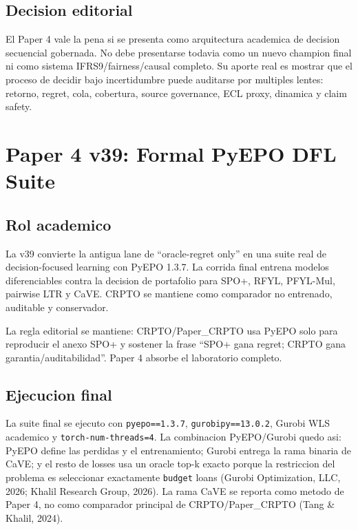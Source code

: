 \documentclass[
  spanish,
  11pt,
  letterpaper,
]{scrbook}
\theoremstyle{plain}
\theoremstyle{remark}
\begin{document}
\section{Decision editorial}\label{decision-editorial}

El Paper 4 vale la pena si se presenta como arquitectura academica de
decision secuencial gobernada. No debe presentarse todavia como un nuevo
champion final ni como sistema IFRS9/fairness/causal completo. Su aporte
real es mostrar que el proceso de decidir bajo incertidumbre puede
auditarse por multiples lentes: retorno, regret, cola, cobertura, source
governance, ECL proxy, dinamica y claim safety.

\chapter{Paper 4 v39: Formal PyEPO DFL
Suite}\label{paper-4-v39-formal-pyepo-dfl-suite}

\section{Rol academico}\label{rol-academico}

La v39 convierte la antigua lane de ``oracle-regret only'' en una suite
real de decision-focused learning con PyEPO 1.3.7. La corrida final
entrena modelos diferenciables contra la decision de portafolio para
SPO+, RFYL, PFYL-Mul, pairwise LTR y CaVE. CRPTO se mantiene como
comparador no entrenado, auditable y conservador.

La regla editorial se mantiene: CRPTO/Paper\_CRPTO usa PyEPO solo para
reproducir el anexo SPO+ y sostener la frase ``SPO+ gana regret; CRPTO
gana garantia/auditabilidad''. Paper 4 absorbe el laboratorio completo.

\section{Ejecucion final}\label{ejecucion-final}

La suite final se ejecuto con \texttt{pyepo==1.3.7},
\texttt{gurobipy==13.0.2}, Gurobi WLS academico y
\texttt{torch-num-threads=4}. La combinacion PyEPO/Gurobi quedo asi:
PyEPO define las perdidas y el entrenamiento; Gurobi entrega la rama
binaria de CaVE; y el resto de losses usa un oracle top-k exacto porque
la restriccion del problema es seleccionar exactamente \texttt{budget}
loans (Gurobi Optimization, LLC, 2026; Khalil Research Group, 2026). La
rama CaVE se reporta como metodo de Paper 4, no como comparador
principal de CRPTO/Paper\_CRPTO (Tang \& Khalil, 2024).
\end{document}
